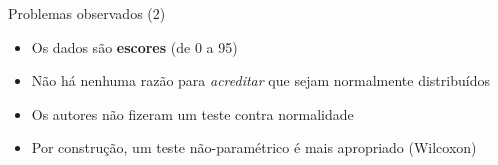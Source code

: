 \documentclass{beamer}
\begin{document}


\begin{frame}{Problemas observados (2)}
  \begin{itemize}
  \item Os dados são {\bf escores} (de 0 a 95)
  \item Não há nenhuma razão para {\em acreditar} que sejam normalmente distribuídos
  \item Os autores não fizeram um teste contra normalidade
  \item Por construção, um teste não-paramétrico é mais apropriado (Wilcoxon)
  \end{itemize}
\end{frame}
\end{document}
